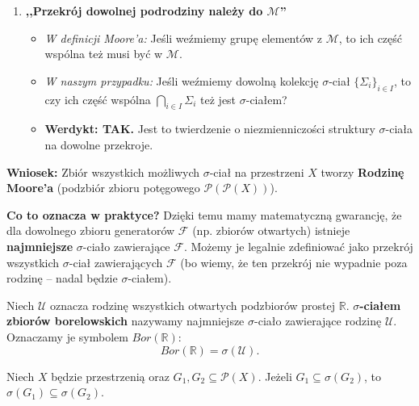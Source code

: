 \begin{contextline}
\begin{enumerate}[label=\textbf{Warunek \arabic*:}, wide]
    \item \textbf{,,Przekrój dowolnej podrodziny należy do $\mathcal{M}$''}
    \begin{itemize}
        \item \textit{W definicji Moore'a:} Jeśli weźmiemy grupę elementów z $\mathcal{M}$, to ich część wspólna też musi być w $\mathcal{M}$.
        \item \textit{W naszym przypadku:} Jeśli weźmiemy dowolną kolekcję $\sigma$-ciał $\{\Sigma_i\}_{i \in I}$, to czy ich część wspólna $\bigcap_{i \in I} \Sigma_i$ też jest $\sigma$-ciałem?
        \item \textbf{Werdykt: TAK.} Jest to twierdzenie o niezmienniczości struktury $\sigma$-ciała na dowolne przekroje.
    \end{itemize}
\end{enumerate}

\begin{summary}
    \textbf{Wniosek:} Zbiór wszystkich możliwych $\sigma$-ciał na przestrzeni $X$ tworzy \textbf{Rodzinę Moore’a} (podzbiór zbioru potęgowego $\mathcal{P}(\mathcal{P}(X))$).
    
    \textbf{Co to oznacza w praktyce?}
    Dzięki temu mamy matematyczną gwarancję, że dla dowolnego zbioru generatorów $\mathcal{F}$ (np. zbiorów otwartych) istnieje \textbf{najmniejsze} $\sigma$-ciało zawierające $\mathcal{F}$.
    Możemy je legalnie zdefiniować jako przekrój wszystkich $\sigma$-ciał zawierających $\mathcal{F}$ (bo wiemy, że ten przekrój nie wypadnie poza rodzinę – nadal będzie $\sigma$-ciałem).
\end{summary}
\end{contextline}

\begin{definition}
    Niech $\mathcal{U}$ oznacza rodzinę wszystkich otwartych podzbiorów prostej $\mathbb{R}$.
    \textbf{$\sigma$-ciałem zbiorów borelowskich} nazywamy najmniejsze $\sigma$-ciało zawierające rodzinę $\mathcal{U}$. Oznaczamy je symbolem $Bor(\mathbb{R})$:
    \[
        Bor(\mathbb{R}) = \sigma(\mathcal{U}).
    \]
\end{definition}
\begin{lemma}
    Niech $X$ będzie przestrzenią oraz $G_1, G_2 \subseteq \mathcal{P}(X)$. 
    Jeżeli $G_1 \subseteq \sigma(G_2)$, to $\sigma(G_1) \subseteq \sigma(G_2)$.
\end{lemma}

